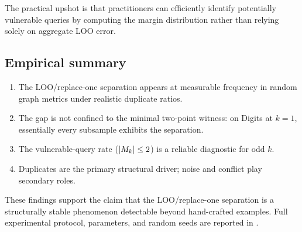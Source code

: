 The practical upshot is that practitioners can efficiently identify potentially
vulnerable queries by computing the margin distribution rather than relying
solely on aggregate LOO error.

\subsection{Empirical summary}

\begin{enumerate}[leftmargin=*,label=(\arabic*)]
    \item The LOO/replace-one separation appears at measurable frequency in
        random graph metrics under realistic duplicate ratios.
    \item The gap is not confined to the minimal two-point witness: on Digits
        at $k=1$, essentially every subsample exhibits the separation.
    \item The vulnerable-query rate ($|M_k| \le 2$) is a reliable diagnostic
        for odd $k$.
    \item Duplicates are the primary structural driver; noise and conflict play
        secondary roles.
\end{enumerate}

These findings support the claim that the LOO/replace-one separation is a
structurally stable phenomenon detectable beyond hand-crafted examples.  Full
experimental protocol, parameters, and random seeds are reported in
.
